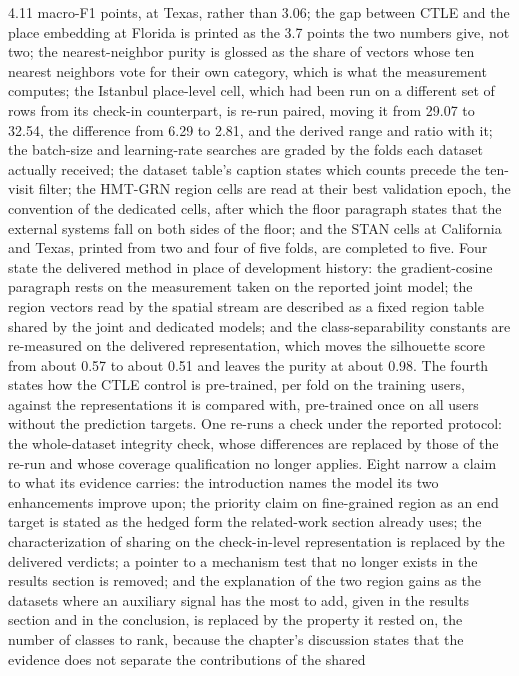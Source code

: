 4.11 macro-F1 points, at Texas, rather than 3.06; the gap between CTLE and the place embedding at
Florida is printed as the 3.7 points the two numbers give, not two; the nearest-neighbor purity is
glossed as the share of vectors whose ten nearest neighbors vote for their own category, which is
what the measurement computes; the Istanbul place-level cell, which had been run on a different set
of rows from its check-in counterpart, is re-run paired, moving it from 29.07 to 32.54, the difference
from 6.29 to 2.81, and the derived range and ratio with it; the batch-size and learning-rate
searches are graded by the folds each dataset actually received; the dataset table's caption
states which counts precede the ten-visit filter; the HMT-GRN region cells are read at their
best validation epoch, the convention of the dedicated cells, after which the floor paragraph states
that the external systems fall on both sides of the floor; and the STAN cells at California and
Texas, printed from two and four of five folds, are completed to five. Four
state the delivered method in place of development history: the gradient-cosine paragraph rests
on the measurement taken on the reported joint model; the region vectors read by the
spatial stream are described as a fixed region table shared by the joint and dedicated models;
and the class-separability constants are re-measured on the delivered representation, which
moves the silhouette score from about 0.57 to about 0.51 and leaves the purity at about 0.98. The fourth states how the CTLE control is pre-trained, per fold on
the training users, against the representations it is compared with, pre-trained once on all users
without the prediction targets.
One re-runs a check under the reported protocol: the
whole-dataset integrity check, whose differences are replaced by those of the re-run and whose
coverage qualification no longer applies. Eight narrow a claim to what its evidence
carries: the introduction names the model its two enhancements improve upon; the priority claim
on fine-grained region as an end target is stated as the hedged form the related-work section
already uses; the characterization of sharing on the check-in-level representation is replaced
by the delivered verdicts; a pointer to a mechanism test that no longer exists in the
results section is removed; and the explanation of the two region gains as the datasets where
an auxiliary signal has the most to add, given in the results section and in the conclusion, is
replaced by the property it rested on, the number of classes to rank, because the chapter's
discussion states that the evidence does not separate the contributions of the shared
